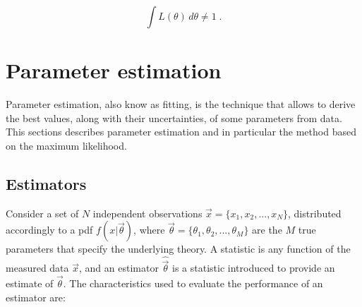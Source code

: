 \begin{equation}
\int L(\theta) \, d \theta \neq 1 \; . 
\end{equation}

\section{Parameter estimation}
\label{sec:stat:pe}

Parameter estimation, also know as fitting, is the technique that allows to derive the best values, along with their uncertainties, 
of some parameters from data.
This sections describes parameter estimation and in particular the method based on the maximum likelihood.

\subsection{Estimators}

Consider a set of $N$ independent observations $\vec{x}=\{x_1, x_2, ..., x_{N}\}$, distributed accordingly to a \gls{pdf} $f(x|\vec{\theta})$, where $\vec{\theta}=\{\theta_1, \theta_2, ..., \theta_{M}\}$ are the $M$ true parameters that specify the underlying theory. 
A statistic is any function of the measured data $\vec{x}$, and an estimator $\hat{\vec{\theta}}$ is a statistic introduced to provide an estimate of $\vec{\theta}$.
The characteristics used to evaluate the performance of an estimator are:

